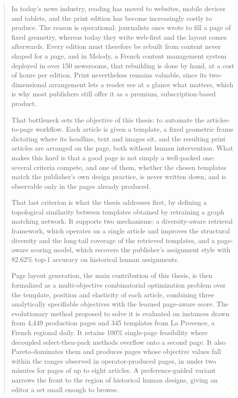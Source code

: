 
\begin{ResumeMotsCles}

\begin{abstract}
In today's news industry, reading has moved to websites, mobile devices and tablets, and the print edition has become increasingly costly to produce. The reason is operational: journalists once wrote to fill a page of fixed geometry, whereas today they write web-first and the layout comes afterwards. Every edition must therefore be rebuilt from content never shaped for a page, and in Melody, a French content management system deployed in over 150 newsrooms, that rebuilding is done by hand, at a cost of hours per edition. Print nevertheless remains valuable, since its two-dimensional arrangement lets a reader see at a glance what matters, which is why most publishers still offer it as a premium, subscription-based product.

That bottleneck sets the objective of this thesis: to automate the articles-to-page workflow. Each article is given a template, a fixed geometric frame dictating where its headline, text and images sit, and the resulting print articles are arranged on the page, both without human intervention. What makes this hard is that a good page is not simply a well-packed one: several criteria compete, and one of them, whether the chosen templates match the publisher's own design practice, is never written down, and is observable only in the pages already produced.

That last criterion is what the thesis addresses first, by defining a topological similarity between templates obtained by retraining a graph matching network. It supports two mechanisms: a diversity-aware retrieval framework, which operates on a single article and improves the structural diversity and the long-tail coverage of the retrieved templates, and a page-aware scoring model, which recovers the publisher's assignment style with 82.62\% top-1 accuracy on historical human assignments.

Page layout generation, the main contribution of this thesis, is then formalized as a multi-objective combinatorial optimization problem over the template, position and elasticity of each article, combining three analytically specifiable objectives with the learned page-aware score. The evolutionary method proposed to solve it is evaluated on instances drawn from 4,449 production pages and 345 templates from La Provence, a French regional daily. It retains 100\% single-page feasibility where decoupled select-then-pack methods overflow onto a second page. It also Pareto-dominates them and produces pages whose objective values fall within the ranges observed in operator-produced pages, in under two minutes for pages of up to eight articles. A preference-guided variant narrows the front to the region of historical human designs, giving an editor a set small enough to browse.


\end{abstract}
\end{ResumeMotsCles}

